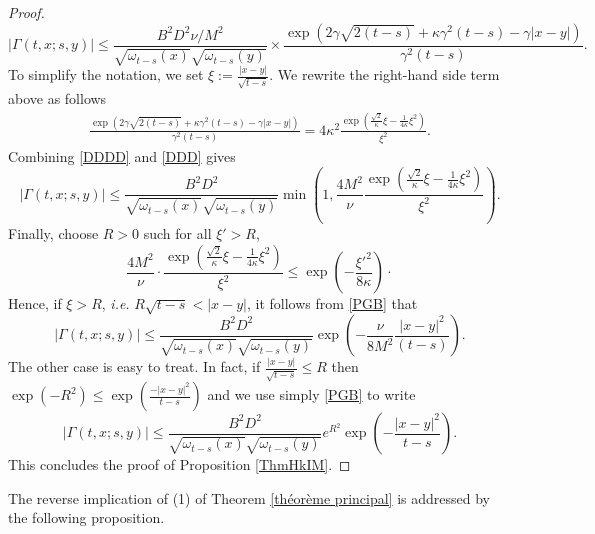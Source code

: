 \documentclass[12pt, letterpaper]{amsart}
\theoremstyle{definition}
\theoremstyle{remark}
\numberwithin{equation}{section}
\begin{document}
\begin{proof}
\begin{equation}\label{DDDD}
     \left | \Gamma(t,x;s,y) \right | \leq \frac{B^2D^2\nu/M^2}{\sqrt{\omega_{t-s}(x)}\sqrt{\omega_{t-s}(y)}} \times \frac{\exp(2\gamma \sqrt{2(t-s)}+\kappa \gamma^2(t-s)-\gamma\left |x-y  \right | )}{\gamma^2(t-s)}.
\end{equation}
To simplify the notation, we set $\xi :=\frac{\left | x-y \right |}{\sqrt{t-s}}$. We rewrite the right-hand side term above as follows 
\begin{align*}
    \frac{\exp(2\gamma \sqrt{2(t-s)}+\kappa \gamma^2(t-s)-\gamma\left |x-y  \right | )}{\gamma^2(t-s)}= 4 \kappa^2 \frac{\exp(\frac{\sqrt{2}}{\kappa}\xi-\frac{1}{4\kappa}\xi^2)}{\xi^2} .
\end{align*}
Combining \eqref{DDDD} and \eqref{DDD} gives
\begin{equation}\label{PGB}
    \left | \Gamma(t,x;s,y) \right |  \leq \frac{B^2D^2}{\sqrt{\omega_{t-s}(x)}\sqrt{\omega_{t-s}(y)}} \min\left ( 1, \frac{4M^2}{\nu} \frac{\exp(\frac{\sqrt{2}}{\kappa}\xi-\frac{1}{4\kappa}\xi^2)}{\xi^2} \right ).
\end{equation}
Finally, choose $R>0$ such for all $\xi'>R$, 
\begin{equation*}
   \frac{4M^2}{\nu} \cdot \frac{\exp(\frac{\sqrt{2}}{\kappa}\xi-\frac{1}{4\kappa}\xi^2)}{\xi^2} \leq \exp(-\frac{{\xi'}^2}{8\kappa})\cdot
\end{equation*}
Hence, if $\xi >R$, \textit{i.e.} $R\sqrt{t-s}<\left | x-y \right |$, it follows from \eqref{PGB} that
\begin{equation*}
     \left | \Gamma(t,x;s,y) \right |  \leq \frac{B^2D^2}{\sqrt{\omega_{t-s}(x)}\sqrt{\omega_{t-s}(y)}} \exp(-\frac{\nu}{8M^2}\frac{{\left | x-y \right |}^2}{(t-s)}).
\end{equation*}
The other case is easy to treat. In fact, if $\frac{\left | x-y \right |}{\sqrt{t-s}}\leq R$ then $\exp(-R^2)\leq \exp\left ( \frac{-\left | x-y \right |^2}{t-s} \right )$ and we use simply \eqref{PGB} to write 
$$ \left | \Gamma(t,x;s,y) \right |  \leq \frac{B^2D^2}{\sqrt{\omega_{t-s}(x)}\sqrt{\omega_{t-s}(y)}} e^{R^2} \exp\left (- \frac{\left | x-y \right |^2}{t-s} \right ).$$
This concludes the proof of Proposition \ref{ThmHkIM}.
\end{proof}

The reverse implication of (1) of Theorem \ref{théorème principal} is addressed by the following proposition.
\end{document}
